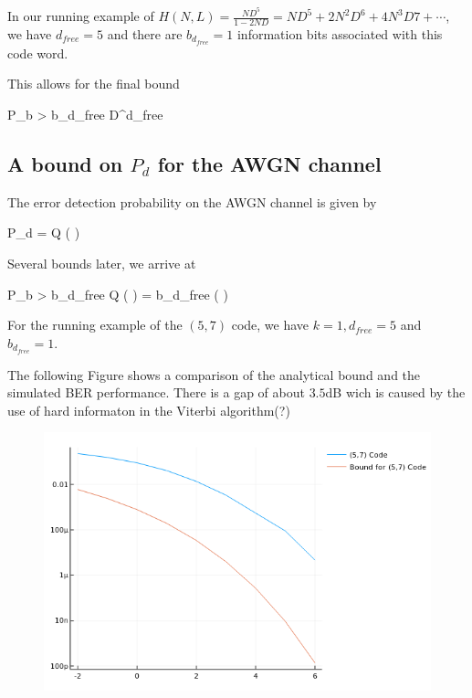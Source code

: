 In our running example of $H(N,L) = \frac{ND^5}{1-2ND} = ND^5 + 2N^2D^6 + 4N^3D7 + \cdots$, we have $d_{free} = 5$ and there are $b_{d_{free}} = 1$ information bits associated with this code word.

This allows for the final bound

\bee
P_b >  b_{d_{free}} D^{d_{free}}
\eee



\subsection{A bound on $P_d$ for the AWGN channel}

The error detection probability on the AWGN channel is given by

\bee
P_d = Q \left(  \right)
\eee

Several bounds later, we arrive at

\bee
P_b >  b_{d_{free}} Q \left(  \right) =  b_{d_{free}}  \left(  \right)
\eee

For the running example of the $(5,7)$ code, we have $k=1, d_{free} = 5$ and $b_{d_{free}} = 1$.

The following Figure shows a comparison of the analytical bound and the simulated BER performance. There is a gap of about $3.5$dB wich is caused by the use of hard informaton in the Viterbi algorithm(?)

\begin{figure}[ht]
  \includegraphics[scale=0.5]{images/convcodes_2_1.png}
\end{figure}

